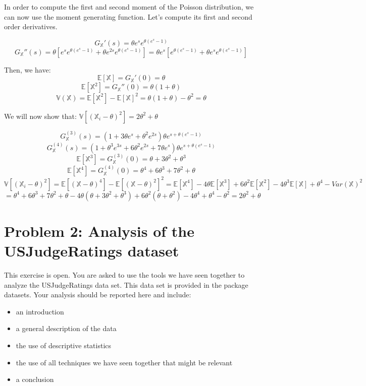 \documentclass[]{article}
\providecommand{\tightlist}{%
  \setlength{\itemsep}{0pt}\setlength{\parskip}{0pt}}
\begin{document}
In order to compute the first and second moment of the Poisson
distribution, we can now use the moment generating function. Let's
compute its first and second order derivatives.

\[G_\mathbb{X}' (s) = \theta e^{s} e^{\theta (e^{s}-1)}\]
\[G_\mathbb{X}'' (s) = \theta [e^{s} e^{\theta (e^{s}-1)} + \theta e^{2s} e^{\theta (e^{s}-1)}] = \theta e^{s} [e^{\theta (e^{s}-1)} + \theta e^{s} e^{\theta (e^{s}-1)}]\]

Then, we have: \[\mathbb{E} [\mathbb{X}] = G_\mathbb{X}' (0) = \theta\]
\[\mathbb{E} [\mathbb{X}^2] = G_\mathbb{X}'' (0) = \theta(1 + \theta)\]
\[\mathbb{V}(\mathbb{X}) = \mathbb{E} [\mathbb{X}^2] - \mathbb{E} [\mathbb{X}]^2 = \theta(1 + \theta) - \theta^2 = \theta\]

We will now show that:
\(\mathbb{V}[(\mathbb{X}_i - \theta)^2] = 2 \theta^2 + \theta\)

\[G_\mathbb{X}^{(3)} (s) = (1 + 3 \theta e^{s} + \theta^2 e^{2s}) \theta e^{s + \theta (e^{s}-1)}\]
\[G_\mathbb{X}^{(4)} (s) = (1 + \theta^3 e^{3s} + 6 \theta^2 e^{2s} + 7\theta e^{s}) \theta e^{s + \theta (e^{s}-1)}\]
\[\mathbb{E} [\mathbb{X}^3] = G_\mathbb{X}^{(3)} (0) = \theta + 3\theta^2 + \theta^3\]
\[\mathbb{E} [\mathbb{X}^4] = G_\mathbb{X}^{(4)} (0) = \theta^4 + 6\theta^3 + 7\theta^2 + \theta\]
\[
\mathbb{V}[(\mathbb{X}_i - \theta)^2] = \mathbb{E} [(\mathbb{X} - \theta)^4] - \mathbb{E} [(\mathbb{X} - \theta)^2]^2 = \mathbb{E} [\mathbb{X}^4] - 4 \theta \mathbb{E} [\mathbb{X}^3] + 6 \theta^2 \mathbb{E} [\mathbb{X}^2]  - 4 \theta^3 \mathbb{E} [\mathbb{X}] + \theta^4 - Var (\mathbb{X})^2
\] \[
= \theta^4 + 6\theta^3 + 7\theta^2 + \theta - 4\theta (\theta + 3\theta^2 + \theta^3) + 6 \theta^2 (\theta +\theta^2) - 4\theta^4  + \theta^4 - \theta^2 = 2 \theta^2 + \theta
\]

\hypertarget{problem-2-analysis-of-the-usjudgeratings-dataset}{%
\section{Problem 2: Analysis of the USJudgeRatings
dataset}\label{problem-2-analysis-of-the-usjudgeratings-dataset}}

This exercise is open. You are asked to use the tools we have seen
together to analyze the USJudgeRatings data set. This data set is
provided in the package datasets. Your analysis should be reported here
and include:

\begin{itemize}
\tightlist
\item
  an introduction
\item
  a general description of the data
\item
  the use of descriptive statistics
\item
  the use of all techniques we have seen together that might be relevant
\item
  a conclusion
\end{itemize}
\end{document}
